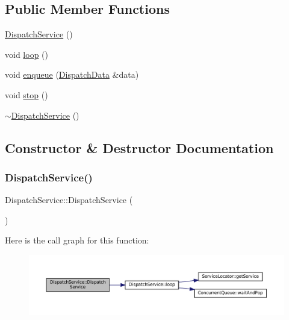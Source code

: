 \subsection*{Public Member Functions}
\begin{DoxyCompactItemize}
\item 
\mbox{\hyperlink{classDispatchService_a71022bcc29c8a76ac2af156c369ef116}{Dispatch\+Service}} ()
\item 
void \mbox{\hyperlink{classDispatchService_aa7b4c44dbb842aa208e4109da6c68465}{loop}} ()
\item 
void \mbox{\hyperlink{classDispatchService_a0180e712e67d8062499f25a49747c1f8}{enqueue}} (\mbox{\hyperlink{structDispatchData}{Dispatch\+Data}} \&data)
\item 
void \mbox{\hyperlink{classDispatchService_ab0fac2c10f5d1dd90847736cab05fb10}{stop}} ()
\item 
\mbox{\hyperlink{classDispatchService_a7a4866bbec833ad0e8074ef8170de286}{$\sim$\+Dispatch\+Service}} ()
\end{DoxyCompactItemize}


\subsection{Constructor \& Destructor Documentation}
\mbox{\label{classDispatchService_a71022bcc29c8a76ac2af156c369ef116}} 
\subsubsection{\texorpdfstring{Dispatch\+Service()}{DispatchService()}}
{\footnotesize\ttfamily Dispatch\+Service\+::\+Dispatch\+Service (\begin{DoxyParamCaption}{ }\end{DoxyParamCaption})\hspace{0.3cm}{\ttfamily [inline]}}

Here is the call graph for this function\+:
\nopagebreak
\begin{figure}[H]
\begin{center}
\leavevmode
\includegraphics[width=350pt]{classDispatchService_a71022bcc29c8a76ac2af156c369ef116_cgraph}
\end{center}
\end{figure}
\mbox{\label{classDispatchService_a7a4866bbec833ad0e8074ef8170de286}} 
